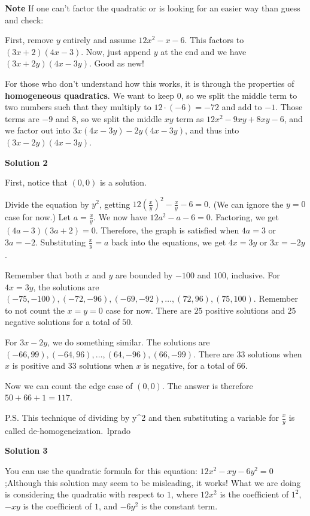 \begin{enumerate}
 \textbf{Note} If one can't factor the quadratic or is looking for an easier way than guess and check:

 First, remove $y$ entirely and assume $12x^2 - x-6$. This factors to $(3x+2)(4x-3)$. Now, just append $y$ at the end and we have $(3x+2y)(4x-3y)$. Good as new!

 For those who don't understand how this works, it is through the properties of \textbf{homogeneous quadratics}. We want to keep 0, so we split the middle term to two numbers such that they multiply to $12 \cdot (-6) = -72$ and add to $-1$. Those terms are $-9$ and $8$, so we split the middle $xy$ term as $12x^2 - 9xy + 8xy - 6$, and we factor out into $3x(4x - 3y) - 2y(4x-3y)$, and thus into $(3x-2y)(4x-3y)$.

 



\textbf{Solution 2}

First, notice that $(0,0)$ is a solution.

 Divide the equation by $y^2$, getting $12(\frac{x}{y})^2-\frac{x}{y}-6 = 0$. (We can ignore the $y=0$ case for now.) Let $a = \frac{x}{y}$. We now have $12a^2-a-6=0$. Factoring, we get $(4a-3)(3a+2) = 0$. Therefore, the graph is satisfied when $4a=3$ or $3a=-2$. Substituting $\frac{x}{y} = a$ back into the equations, we get $4x=3y$ or $3x=-2y$.

 Remember that both $x$ and $y$ are bounded by $-100$ and $100$, inclusive. For $4x=3y$, the solutions are $(-75,-100), (-72,-96), (-69, -92), \dots, (72,96), (75,100)$. Remember to not count the $x=y=0$ case for now. There are $25$ positive solutions and $25$ negative solutions for a total of $50$.

 For $3x-2y$, we do something similar. The solutions are $(-66,99), (-64,96), \dots, (64, -96), (66, -99)$. There are $33$ solutions when $x$ is positive and $33$ solutions when $x$ is negative, for a total of $66$.

 Now we can count the edge case of $(0,0)$. The answer is therefore $50+66+1 = \boxed{117}$.

 P.S. This technique of dividing by y\textasciicircum{}2 and then substituting a variable for $\frac{x}{y}$ is called de-homogeneization.~lprado

 



\textbf{Solution 3}

You can use the quadratic formula for this equation: $12x^2 - xy - 6y^2 = 0$;Although this solution may seem to be misleading, it works! What we are doing is considering the quadratic with respect to $1$, where $12x^2$ is the coefficient of $1^2$, $-xy$ is the coefficient of $1$, and $-6y^2$ is the constant term.


\end{enumerate}
